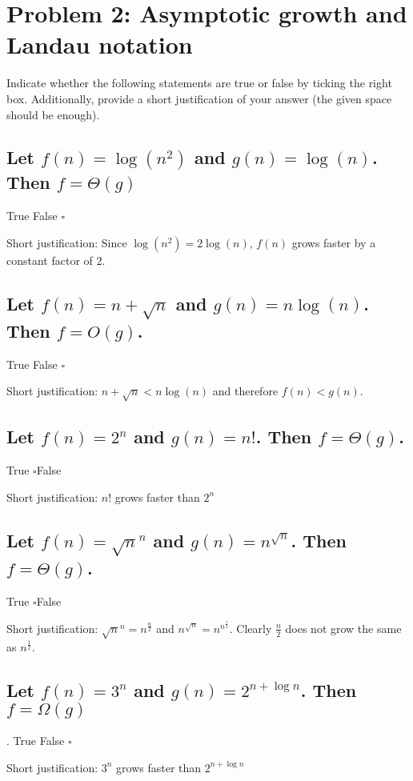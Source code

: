 \documentclass[12pt, a4]{article}
\newcommand{\cmark}{\ding{51}}%
\newcommand{\checkedbox}{\rlap{$\square$}{\raisebox{2pt}{\hspace{1pt}\cmark}}}
\begin{document}
\section{Problem 2: Asymptotic growth and Landau notation}
Indicate whether the following statements are true or false by ticking the right box. Additionally, provide a short justification of your answer (the given space should be enough).
\subsection{Let $f(n) = \log(n^2)$ and $g(n) = \log(n)$. Then $f= \Theta(g)$}

True \checkedbox\quad False $\square$

Short justification: Since $\log(n^2) = 2 \log(n)$, $f(n)$ grows faster by a constant factor of $2$.

\subsection{Let $f(n) = n+\sqrt{n}$ and $g(n) = n\log(n)$. Then $f=O(g)$.}
True \checkedbox\quad False $\square$

Short justification: $n + \sqrt{n} < n\log(n)$ and therefore $f(n) < g(n)$.

\subsection{Let $f(n) = 2^n$ and $g(n) =n!$. Then $f= \Theta(g)$.}
True $\square$\quad False \checkedbox

Short justification: $n!$ grows faster than $2^n$

\subsection{Let $f(n) =\sqrt{n}^n$ and $g(n) =n^{\sqrt{n}}$. Then $f= \Theta(g)$.}
True $\square$\quad False \checkedbox

Short justification: $\sqrt{n}^n = n^{\frac{n}{2}}$ and $n^{\sqrt{n}} = n^{n^\frac{1}{2}}$. Clearly $\frac{n}{2}$ does not grow the same as $n^\frac{1}{2}$.

\subsection{Let $f(n) = 3^n$ and $g(n) = 2^{n+\log n}$. Then $f= \Omega(g)$}.
True \checkedbox\quad False $\square$

Short justification: $3^n$ grows faster than $2^{n+\log n}$
\end{document}
